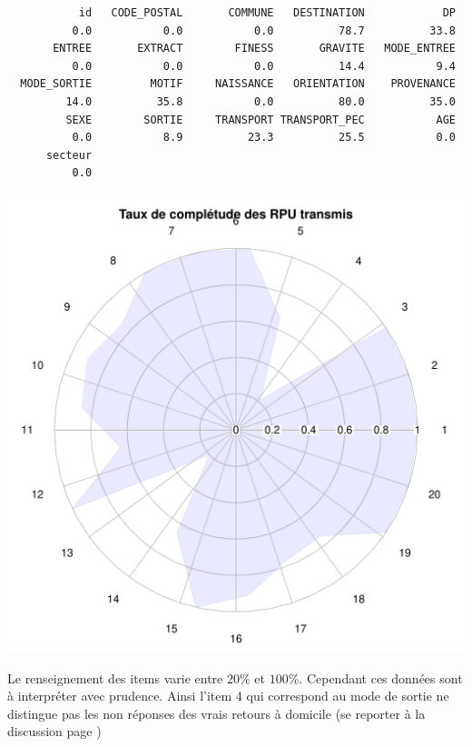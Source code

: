 \documentclass[12pt,english,french,twoside]{book}\usepackage[]{graphicx}\usepackage[]{color}
\makeatletter
\def\maxwidth{ %
  \ifdim\Gin@nat@width>\linewidth
    \linewidth
  \else
    \Gin@nat@width
  \fi
}
\newenvironment{kframe}{%
 \def\at@end@of@kframe{}%
 \ifinner\ifhmode%
  \def\at@end@of@kframe{\end{minipage}}%
  \begin{minipage}{\columnwidth}%
 \fi\fi%
 \def\FrameCommand##1{\hskip\@totalleftmargin \hskip-\fboxsep
 \colorbox{shadecolor}{##1}\hskip-\fboxsep
     \hskip-\linewidth \hskip-\@totalleftmargin \hskip\columnwidth}%
 \MakeFramed {\advance\hsize-\width
   \@totalleftmargin\z@ \linewidth\hsize
   \@setminipage}}%
 {\par\unskip\endMakeFramed%
 \at@end@of@kframe}
\newenvironment{knitrout}{}{} %
\makeatother
\begin{document}
\begin{knitrout}
\color{fgcolor}\begin{kframe}
\begin{verbatim}
           id   CODE_POSTAL       COMMUNE   DESTINATION            DP 
          0.0           0.0           0.0          78.7          33.8 
       ENTREE       EXTRACT        FINESS       GRAVITE   MODE_ENTREE 
          0.0           0.0           0.0          14.4           9.4 
  MODE_SORTIE         MOTIF     NAISSANCE   ORIENTATION    PROVENANCE 
         14.0          35.8           0.0          80.0          35.0 
         SEXE        SORTIE     TRANSPORT TRANSPORT_PEC           AGE 
          0.0           8.9          23.3          25.5           0.0 
      secteur 
          0.0 
\end{verbatim}
\end{kframe}
\includegraphics[width=\maxwidth]{figure/radar} 

\end{knitrout}


Le renseignement des items varie entre $20\%$ et $100\%$. Cependant ces données sont à interpréter avec prudence. Ainsi l'item 4 qui correspond au mode de sortie ne distingue pas les non réponses des vrais retours à domicile (se reporter à la discussion page \pageref{ref:sortie})
\end{document}
